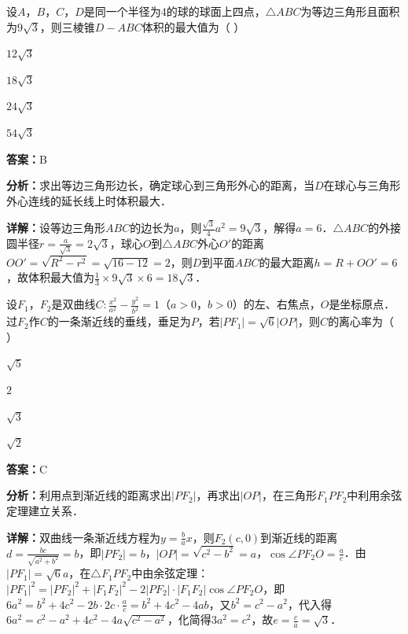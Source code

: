 \begin{question}[points=5]
设$A$，$B$，$C$，$D$是同一个半径为4的球的球面上四点，$\triangle ABC$为等边三角形且面积为$9\sqrt{3}$，则三棱锥$D-ABC$体积的最大值为（ ）
\begin{choices}
  \item $12\sqrt{3}$
  \item $18\sqrt{3}$
  \item $24\sqrt{3}$
  \item $54\sqrt{3}$
\end{choices}
\begin{solution}
\textbf{答案：}B

\textbf{分析：}求出等边三角形边长，确定球心到三角形外心的距离，当$D$在球心与三角形外心连线的延长线上时体积最大．

\textbf{详解：}设等边三角形$ABC$的边长为$a$，则$\frac{\sqrt{3}}{4}a^2=9\sqrt{3}$，解得$a=6$．$\triangle ABC$的外接圆半径$r=\frac{a}{\sqrt{3}}=2\sqrt{3}$，球心$O$到$\triangle ABC$外心$O'$的距离$OO'=\sqrt{R^2-r^2}=\sqrt{16-12}=2$，则$D$到平面$ABC$的最大距离$h=R+OO'=6$，故体积最大值为$\frac{1}{3}\times9\sqrt{3}\times6=18\sqrt{3}$．
\end{solution}
\end{question}

\begin{question}[points=5]
设$F_1$，$F_2$是双曲线$C:\frac{x^2}{a^2}-\frac{y^2}{b^2}=1$（$a>0$，$b>0$）的左、右焦点，$O$是坐标原点．过$F_2$作$C$的一条渐近线的垂线，垂足为$P$，若$|PF_1|=\sqrt{6}|OP|$，则$C$的离心率为（ ）
\begin{choices}
  \item $\sqrt{5}$
  \item $2$
  \item $\sqrt{3}$
  \item $\sqrt{2}$
\end{choices}
\begin{solution}
\textbf{答案：}C

\textbf{分析：}利用点到渐近线的距离求出$|PF_2|$，再求出$|OP|$，在三角形$F_1PF_2$中利用余弦定理建立关系．

\textbf{详解：}双曲线一条渐近线方程为$y=\frac{b}{a}x$，则$F_2(c,0)$到渐近线的距离$d=\frac{bc}{\sqrt{a^2+b^2}}=b$，即$|PF_2|=b$，$|OP|=\sqrt{c^2-b^2}=a$，$\cos\angle PF_2O=\frac{a}{c}$．由$|PF_1|=\sqrt{6}a$，在$\triangle F_1PF_2$中由余弦定理：$|PF_1|^2=|PF_2|^2+|F_1F_2|^2-2|PF_2|\cdot|F_1F_2|\cos\angle PF_2O$，即$6a^2=b^2+4c^2-2b\cdot2c\cdot\frac{a}{c}=b^2+4c^2-4ab$，又$b^2=c^2-a^2$，代入得$6a^2=c^2-a^2+4c^2-4a\sqrt{c^2-a^2}$，化简得$3a^2=c^2$，故$e=\frac{c}{a}=\sqrt{3}$．
\end{solution}
\end{question}

